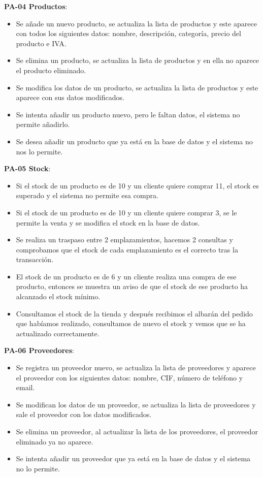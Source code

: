 \textbf{PA-04 Productos}:
\begin{itemize}
	\item Se añade un nuevo producto, se actualiza la lista de productos y este aparece con todos los siguientes datos: nombre, descripción, categoría, precio del producto e IVA.
	\item Se elimina un producto, se actualiza la lista de productos y en ella no aparece el producto eliminado.
	\item Se modifica los datos de un producto, se actualiza la lista de productos y este aparece con sus datos modificados.
	\item Se intenta añadir un producto nuevo, pero le faltan datos, el sistema no permite añadirlo.
	\item Se desea añadir un producto que ya está en la base de datos y el sistema no nos lo permite.
\end{itemize}

\textbf{PA-05 Stock}:
\begin{itemize}
	\item Si el stock de un producto es de 10 y un cliente quiere comprar 11, el stock es superado y el sistema no permite esa compra.
	\item Si el stock de un producto es de 10 y un cliente quiere comprar 3, se le permite la venta y se modifica el stock en la base de datos.
	\item Se realiza un traspaso entre 2 emplazamientos, hacemos 2 consultas y comprobamos que el stock de cada emplazamiento es el correcto tras la transacción.
	\item El stock de un producto es de 6 y un cliente realiza una compra de ese producto, entonces se muestra un aviso de que el stock de ese producto ha alcanzado el stock mínimo.
	\item Consultamos el stock de la tienda y después recibimos el albarán del pedido que habíamos realizado, consultamos de nuevo el stock y vemos que se ha actualizado correctamente.
\end{itemize}

\textbf{PA-06 Proveedores}:
\begin{itemize}
	\item Se registra un proveedor nuevo, se actualiza la lista de proveedores y aparece el proveedor con los siguientes datos: nombre, CIF, número de teléfono y email.
	\item Se modifican los datos de un proveedor, se actualiza la lista de proveedores y sale el proveedor con los datos modificados.
	\item Se elimina un proveedor, al actualizar la lista de los proveedores, el proveedor eliminado ya no aparece.
	\item Se intenta añadir un proveedor que ya está en la base de datos y el sistema no lo permite.
\end{itemize}


